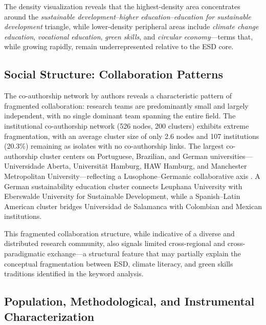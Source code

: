 \documentclass[pdflatex,sn-basic]{sn-jnl}%
\begin{document}
The density visualization reveals that the highest-density area concentrates around the \textit{sustainable development}--\textit{higher education}--\textit{education for sustainable development} triangle, while lower-density peripheral areas include \textit{climate change education}, \textit{vocational education}, \textit{green skills}, and \textit{circular economy}---terms that, while growing rapidly, remain underrepresented relative to the ESD core.

\subsection{Social Structure: Collaboration Patterns}

The co-authorship network by authors reveals a characteristic pattern of fragmented collaboration: research teams are predominantly small and largely independent, with no single dominant team spanning the entire field. The institutional co-authorship network (526 nodes, 200 clusters) exhibits extreme fragmentation, with an average cluster size of only 2.6 nodes and 107 institutions (20.3\%) remaining as isolates with no co-authorship links. The largest co-authorship cluster centers on Portuguese, Brazilian, and German universities---Universidade Aberta, Universit\"{a}t Hamburg, HAW Hamburg, and Manchester Metropolitan University---reflecting a Lusophone--Germanic collaborative axis \cite{caeiro_sustainability_2020, filho_sustainability_2020}. A German sustainability education cluster connects Leuphana University with Eberswalde University for Sustainable Development, while a Spanish--Latin American cluster bridges Universidad de Salamanca with Colombian and Mexican institutions.

This fragmented collaboration structure, while indicative of a diverse and distributed research community, also signals limited cross-regional and cross-paradigmatic exchange---a structural feature that may partially explain the conceptual fragmentation between ESD, climate literacy, and green skills traditions identified in the keyword analysis.

\subsection{Population, Methodological, and Instrumental Characterization}
\end{document}
